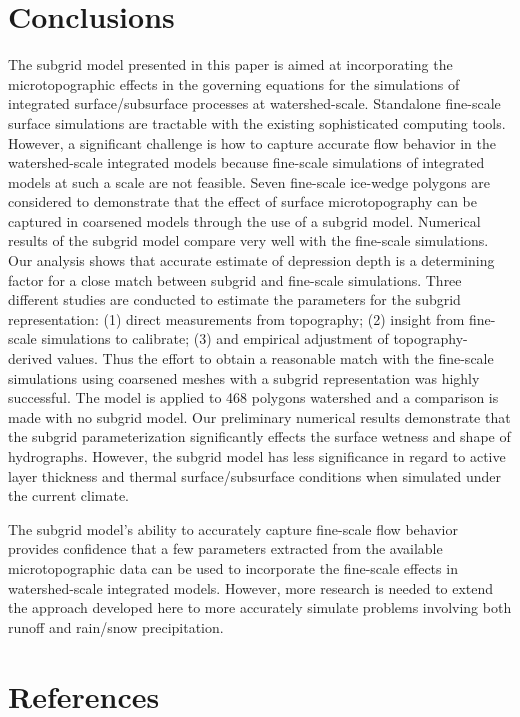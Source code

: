 \documentclass[review,11pt]{elsarticle}
\begin{document}
\section{Conclusions}\label{conclusion}

The subgrid model presented in this paper is aimed at incorporating the microtopographic effects in the governing equations for the simulations of integrated surface/subsurface processes at watershed-scale. Standalone fine-scale surface simulations are tractable with the existing sophisticated computing tools. However, a significant challenge is how to capture accurate flow behavior in the watershed-scale integrated models because fine-scale simulations of integrated models at such a scale are not feasible.
Seven fine-scale ice-wedge polygons are considered to demonstrate that the effect of surface microtopography can be captured in coarsened models through the use of a subgrid model. Numerical results of the subgrid model compare very well with the fine-scale simulations. Our analysis shows that accurate estimate of depression depth is a determining factor for a close match between subgrid and fine-scale simulations.
Three different studies are conducted to estimate the parameters for the subgrid representation: (1) direct measurements from topography; (2) insight from fine-scale simulations to calibrate; (3) and empirical adjustment of topography-derived values. 
Thus the effort to obtain a reasonable match with the fine-scale simulations using coarsened meshes with a subgrid representation was highly successful. The model is applied to 468 polygons watershed and a comparison is made with no subgrid model. Our preliminary numerical results demonstrate that the subgrid parameterization significantly effects the surface wetness and shape of hydrographs. However, the subgrid model has less significance in regard to active layer thickness and thermal surface/subsurface conditions when simulated under the current climate.

The subgrid model's ability to accurately capture fine-scale flow behavior provides confidence that a few parameters extracted from the available microtopographic data can be used to incorporate the fine-scale effects in watershed-scale integrated models.
However, more research is needed to extend the approach developed here to more accurately simulate problems involving both runoff and rain/snow precipitation.


\section*{References}


\end{document}
